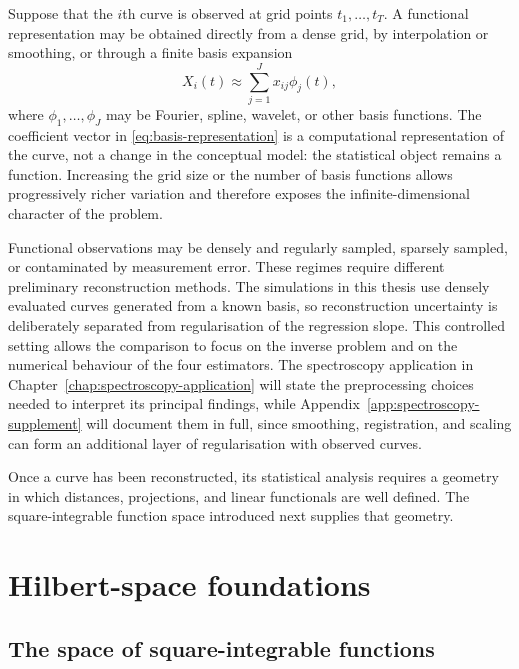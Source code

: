 Suppose that the $i$th curve is observed at grid points $t_1,\ldots,t_T$. A functional representation may be obtained directly from a dense grid, by interpolation or smoothing, or through a finite basis expansion
\begin{equation}
    X_i(t)\approx \sum_{j=1}^{J} x_{ij}\phi_j(t),
    \label{eq:basis-representation}
\end{equation}
where $\phi_1,\ldots,\phi_J$ may be Fourier, spline, wavelet, or other basis functions. The coefficient vector in \eqref{eq:basis-representation} is a computational representation of the curve, not a change in the conceptual model: the statistical object remains a function. Increasing the grid size or the number of basis functions allows progressively richer variation and therefore exposes the infinite-dimensional character of the problem.

Functional observations may be densely and regularly sampled, sparsely sampled, or contaminated by measurement error. These regimes require different preliminary reconstruction methods. The simulations in this thesis use densely evaluated curves generated from a known basis, so reconstruction uncertainty is deliberately separated from regularisation of the regression slope. This controlled setting allows the comparison to focus on the inverse problem and on the numerical behaviour of the four estimators. The spectroscopy application in Chapter~\ref{chap:spectroscopy-application} will state the preprocessing choices needed to interpret its principal findings, while Appendix~\ref{app:spectroscopy-supplement} will document them in full, since smoothing, registration, and scaling can form an additional layer of regularisation with observed curves.

Once a curve has been reconstructed, its statistical analysis requires a geometry in which distances, projections, and linear functionals are well defined. The square-integrable function space introduced next supplies that geometry.

\section{Hilbert-space foundations}
\label{sec:hilbert-foundations}

\subsection{The space of square-integrable functions}

